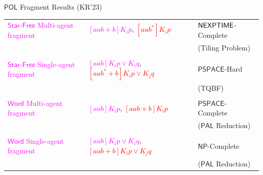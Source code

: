 \documentclass[usenames,dvipsnames]{beamer}
\newcommand{\POL}{\mathsf{POL}}
\newcommand{\starfree}{\mathsf{Star\mbox{-}Free}}
\newcommand{\word}{\mathsf{Word}}
\newcommand{\PSPACE}{\mathsf{PSPACE}}
\newcommand{\NP}{\mathsf{NP}}
\begin{document}
\newcommand{\PAL}{\mathsf{PAL}}
\begin{frame}{$\POL$ Fragment Results (KR'23)\footnotemark[1]}
    \begin{center}
        \begin{tabular}{ m{9em} m{4cm} m{3cm} } 
         \textcolor{Fuchsia}{\textbf{$\starfree$} Multi-agent fragment} & \textcolor{Fuchsia}{$[aab+b]K_i p$}, \textcolor{Red}{\st{$[aab^*]K_i p$}} & $\mathsf{NEXPTIME}$-Complete \\
         & & (Tiling Problem)\\
         & &\\
         \textcolor{Fuchsia}{\textbf{$\starfree$} Single-agent fragment} & \textcolor{Fuchsia}{$[aab]K_i p\vee K_i q$}, \textcolor{Red}{\st{$[aab^*+b]K_i p\vee K_j q$}} & $\PSPACE$-Hard \\ 
         & & (TQBF)\\
         & &\\
         \textcolor{Fuchsia}{$\word$ Multi-agent fragment} & \textcolor{Fuchsia}{$[aab]K_i p$}, \textcolor{Red}{\st{$[aab+b]K_i p$}} & $\PSPACE$-Complete\\
         & & ($\PAL$ Reduction)\\
         & &\\
         \textcolor{Fuchsia}{$\word$ Single-agent fragment} & \textcolor{Fuchsia}{$[aab]K_i p\vee K_i q$}, \textcolor{Red}{\st{$[aab+b]K_i p\vee K_j q$}} & $\NP$-Complete\\
         & & ($\PAL$ Reduction)
        \end{tabular}
    \end{center}
\end{frame}
\end{document}
